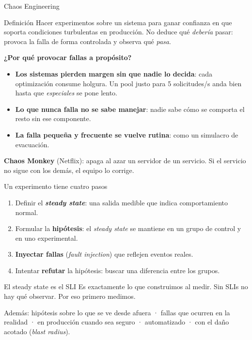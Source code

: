 \documentclass[institutional,screen,none]{ua-engineering-v6-beamer}
\begin{document}
\begin{frame}{Chaos Engineering}
\begin{block}{Definición}
Hacer experimentos sobre un sistema para ganar confianza en que soporta condiciones turbulentas en producción. No deduce qué \emph{debería} pasar: provoca la falla de forma controlada y observa qué \emph{pasa}.
\end{block}

\pause

\textbf{¿Por qué provocar fallas a propósito?}
\begin{itemize}\small
\item \textbf{Los sistemas pierden margen sin que nadie lo decida}: cada optimización consume holgura. Un pool justo para 5 solicitudes/s anda bien hasta que \emph{especiales} se pone lento.
\item \textbf{Lo que nunca falla no se sabe manejar}: nadie sabe cómo se comporta el resto sin ese componente.
\item \textbf{La falla pequeña y frecuente se vuelve rutina}: como un simulacro de evacuación.
\end{itemize}

\pause

{\small \textbf{Chaos Monkey} (Netflix): apaga al azar un servidor de un servicio. Si el servicio no sigue con los demás, el equipo lo corrige.}
\end{frame}

\begin{frame}{Un experimento tiene cuatro pasos}
\begin{enumerate}
\item Definir el \textbf{\emph{steady state}}: una salida medible que indica comportamiento normal.
\item Formular la \textbf{hipótesis}: el \emph{steady state} se mantiene en un grupo de control y en uno experimental.
\item \textbf{Inyectar fallas} (\emph{fault injection}) que reflejen eventos reales.
\item Intentar \textbf{refutar} la hipótesis: buscar una diferencia entre los grupos.
\end{enumerate}

\pause

\begin{alertblock}{El steady state es el SLI}
Es exactamente lo que construimos al medir. Sin SLIs no hay qué observar. Por eso primero medimos.
\end{alertblock}

\pause

{\small Además: hipótesis sobre lo que se ve desde afuera · fallas que ocurren en la realidad · en producción cuando sea seguro · automatizado · con el daño acotado (\emph{blast radius}).}
\end{frame}
\end{document}
